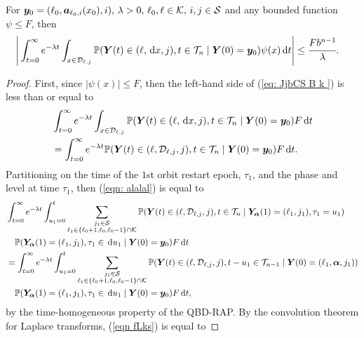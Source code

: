\begin{cor}\label{vcor: cdks d}
	For \(\boldsymbol y_0=(\ell_0,\boldsymbol a_{\ell_0,i}(x_0),i),\, \lambda>0,\, \ell_0,\ell\in\mathcal K,\,i,j\in\mathcal S\) and any bounded function \(\psi\leq F\), then
	\begin{align}
		\Bigg|&\int_{t=0}^\infty e^{-\lambda t}\int_{x\in\mathcal{D}_{\ell,j}}\mathbb P({\boldsymbol Y}(t) \in (\ell,\, \mathrm{d} x, j), t\in\mathcal T_n \mid 
		\boldsymbol Y(0)=\boldsymbol y_0)
		\psi(x) \, \mathrm{d} t \Bigg|
		\leq \cfrac{F b^{n-1}}{\lambda}.\label{eq: JjbCS  B k }
	\end{align}
\end{cor}
\begin{proof}
	First, since \(|\psi(x)|\leq F\), then the left-hand side of (\ref{eq: JjbCS  B k }) is less than or equal to 
	\begin{align}
		&\int_{t=0}^\infty e^{-\lambda t}\int_{x\in\mathcal{D}_{\ell,j}}\mathbb P({\boldsymbol Y}(t) \in (\ell,\, \mathrm{d} x,j), t\in\mathcal T_n \mid  \nonumber 
		\boldsymbol Y(0)=\boldsymbol y_0)F\, \mathrm{d} t \nonumber
		\\&=\int_{t=0}^\infty e^{-\lambda t} \mathbb P( {\boldsymbol Y}(t) \in (\ell,\mathcal D_{\ell,j},j), t\in\mathcal T_n \mid \boldsymbol Y(0)=\boldsymbol y_0)F\, \mathrm{d} t. \label{eqn: alalal}
	\end{align}
	Partitioning on the time of the \(1\)st orbit restart epoch, \(\tau_1\), and the phase and level at time \(\tau_1\), then (\ref{eqn: alalal}) is equal to 
	\begin{align}
		&\int_{t=0}^\infty e^{-\lambda t} \int_{u_1=0}^t \sum_{\substack{j_1\in\mathcal S\\\ell_1\in\{\ell_0+1,\ell_0,\ell_0-1\}\cap\mathcal K}}\mathbb P( {\boldsymbol Y}(t) \in (\ell,\mathcal D_{\ell,j},j), t\in\mathcal T_n \nonumber
		\mid \bm{Y}_{\bm{\alpha}}(1)=(\ell_1,j_1),  \tau_1=u_1)\nonumber
		\\&\quad\mathbb P(\bm{Y}_{\bm{\alpha}}(1)=(\ell_1,j_1), \tau_1\in \, \mathrm{d} u_1
		\mid \boldsymbol Y(0)=\boldsymbol y_0)F  \, \mathrm{d} t\nonumber
		\\&=\int_{t=0}^\infty e^{-\lambda t} \int_{u_1=0}^t \sum_{\substack{j_1\in\mathcal S\\\ell_1\in\{\ell_0+1,\ell_0,\ell_0-1\}\cap\mathcal K}}\mathbb P( {\boldsymbol Y}(t) \in (\ell,\mathcal D_{\ell,j},j), t-u_1\in\mathcal T_{n-1} \nonumber
		\mid 
		\boldsymbol Y(0)=(\ell_1,\boldsymbol \alpha,j_1))
		\\&\quad\mathbb P(\bm{Y}_{\bm{\alpha}}(1)=(\ell_1,j_1), \tau_1\in \, \mathrm{d} u_1
		\mid \boldsymbol Y(0)=\boldsymbol y_0)F  \, \mathrm{d} t, \label{eqn fLks}
	\end{align}
	by the time-homogeneous property of the QBD-RAP. By the convolution theorem for Laplace transforms, (\ref{eqn fLks}) is equal to 

\end{proof}
